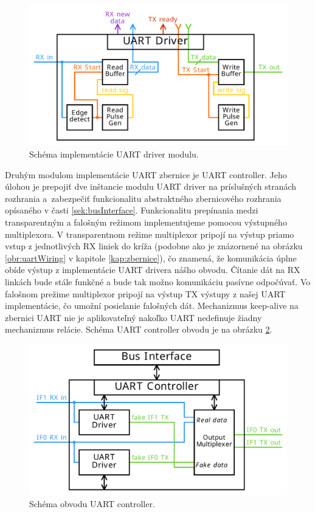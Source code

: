 \begin{figure}
    \centerline{\includegraphics[width=1\textwidth]{images/designs/uartDriver.pdf}}
    \caption[Schéma implementácie UART driver modulu]{Schéma implementácie UART driver modulu.}
    \label{obr:uartDriver}
\end{figure}

Druhým modulom implementácie UART zbernice je UART controller. Jeho úlohou je prepojiť dve inštancie modulu UART driver na príslušných stranách rozhrania a~zabezpečiť funkcionalitu abstraktného zbernicového rozhrania opísaného v časti \ref{sek:busInterface}. Funkcionalitu prepínania medzi transparentným a falošným režimom implementujeme pomocou výstupného multiplexora. V transparentnom režime multiplexor pripojí na výstup priamo vstup z jednotlivých RX liniek do kríža (podobne ako je znázornené na obrázku \ref{obr:uartWiring} v kapitole \ref{kap:zbernice}), čo znamená, že komunikácia úplne obíde výstup z implementácie UART drivera nášho obvodu. Čítanie dát na RX linkách bude stále funkčné a bude tak možno komunikáciu pasívne odpočúvať. Vo falošnom prežime multiplexor pripojí na výstup TX výstupy z našej UART implementácie, čo umožní posielanie falošných dát. Mechanizmus keep-alive na zbernici UART nie je aplikovateľný nakoľko UART nedefinuje žiadny mechanizmus relácie. Schéma UART controller obvodu je na obrázku \ref{obr:uartController}.

\begin{figure}
    \centerline{\includegraphics[width=1\textwidth]{images/designs/uartController.pdf}}
    \caption[Schéma obvodu UART controller]{Schéma obvodu UART controller.}
    \label{obr:uartController}
\end{figure}

